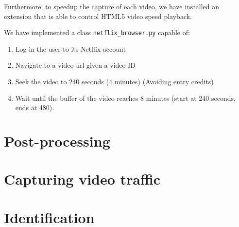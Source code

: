 Furthermore, to speedup the capture of each video, we have installed an
extension that is able to control HTML5 video speed playback.

We have implemented a class \texttt{netflix\_browser.py} capable of:

\begin{enumerate}
    \item Log in the user to its Netflix account
    \item Navigate to a video url given a video ID
    \item Seek the video to 240 seconds (4 minutes) (Avoiding entry credits)
    \item Wait until the buffer of the video reaches 8 minutes (start at 240 seconds, ends at 480).
\end{enumerate}






\section{Post-processing}


\section{Capturing video traffic}


\section{Identification}

